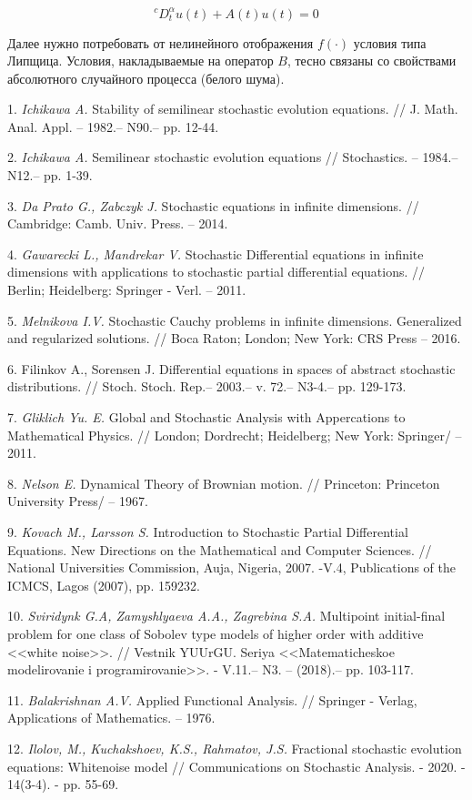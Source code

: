 $$^{c}D_{t}^{\alpha}u(t)+A(t)u(t)=0$$

Далее нужно потребовать от нелинейного отображения $f(\cdot)$ условия типа Липщица. Условия, накладываемые на оператор $B$, тесно связаны со свойствами абсолютного случайного процесса (белого шума).


\litlist

1.	{\it Ichikawa A.} Stability of semilinear stochastic evolution equations. // J. Math. Anal. Appl. – 1982.– N90.– pp. 12-44.

2.	{\it Ichikawa A.} Semilinear stochastic evolution equations // Stochastics. – 1984.– N12.– pp. 1-39.

3.	{\it Da Prato G., Zabczyk J.} Stochastic equations in infinite dimensions. // Cambridge: Camb. Univ. Press. – 2014.

4.	{\it Gawarecki L., Mandrekar V.} Stochastic Differential equations in infinite dimensions with applications to stochastic partial differential equations. // Berlin; Heidelberg: Springer - Verl. – 2011.

5.	{\it Melnikova I.V.} Stochastic Cauchy problems in infinite dimensions. Generalized and regularized solutions. // Boca Raton; London; New York: CRS Press – 2016.

6.	{Filinkov A., Sorensen J.}  Differential equations in spaces of abstract stochastic distributions. // Stoch. Stoch. Rep.– 2003.– v. 72.– N3-4.– pp. 129-173.

7.	{\it Gliklich Yu. E.} Global and Stochastic Analysis with Appercations to Mathematical Physics. // London; Dordrecht; Heidelberg; New York: Springer/ – 2011.

8.	{\it Nelson E.} Dynamical Theory of Brownian motion. // Princeton: Princeton University Press/ – 1967.

9.	{\it Kovach M., Larsson S.} Introduction to Stochastic Partial Differential Equations. New Directions on the Mathematical and Computer Sciences. // National Universities Commission, Auja, Nigeria, 2007. -V.4, Publications of the ICMCS, Lagos (2007), pp. 159232.

10.	{\it Sviridynk G.A, Zamyshlyaeva A.A., Zagrebina S.A.} Multipoint initial-final problem for one class of Sobolev type models of higher order with additive <<white noise>>. // Vestnik YUUrGU. Seriya <<Matematicheskoe modelirovanie i programirovanie>>. - V.11.– N3. – (2018).– pp. 103-117.

11.	{\it Balakrishnan A.V.} Applied Functional Analysis. // Springer - Verlag, Applications of Mathematics. – 1976.

12. {\it Ilolov, M., Kuchakshoev, K.S., Rahmatov, J.S.} Fractional stochastic evolution equations: Whitenoise model // Communications on Stochastic Analysis. - 2020. - 14(3-4). - pp. 55-69.
